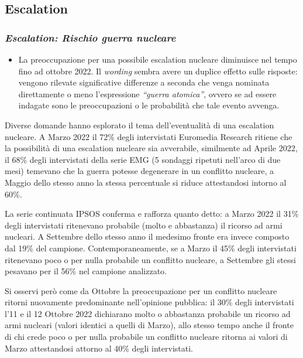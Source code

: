 \documentclass[
]{book}
\providecommand{\tightlist}{%
  \setlength{\itemsep}{0pt}\setlength{\parskip}{0pt}}
\begin{document}
\hypertarget{escalation}{%
\subsection{Escalation}\label{escalation}}

\hypertarget{escalation-rischio-guerra-nucleare}{%
\subsubsection{\texorpdfstring{\emph{Escalation: Rischio guerra nucleare}}{Escalation: Rischio guerra nucleare}}\label{escalation-rischio-guerra-nucleare}}

\begin{itemize}
\tightlist
\item
  La preoccupazione per una possibile escalation nucleare diminuisce nel tempo fino ad ottobre 2022. Il \emph{wording} sembra avere un duplice effetto sulle risposte: vengono rilevate significative differenze a seconda che venga nominata direttamente o meno l'espressione \emph{``guerra atomica''}, ovvero se ad essere indagate sono le preoccupazioni o le probabilità che tale evento avvenga.
\end{itemize}

Diverse domande hanno esplorato il tema dell'eventualità di una escalation nucleare. A Marzo 2022 il 72\% degli intervistati Euromedia Research ritiene che la possibilità di una escalation nucleare sia avverabile, similmente ad Aprile 2022, il 68\% degli intervistati della serie EMG (5 sondaggi ripetuti nell'arco di due mesi) temevano che la guerra potesse degenerare in un conflitto nucleare, a Maggio dello stesso anno la stessa percentuale si riduce attestandosi intorno al 60\%.

La serie continuata IPSOS conferma e rafforza quanto detto: a Marzo 2022 il 31\% degli intervistati ritenevano probabile (molto e abbastanza) il ricorso ad armi nucleari. A Settembre dello stesso anno il medesimo fronte era invece composto dal 19\% del campione. Contemporaneamente, se a Marzo il 45\% degli intervistati ritenevano poco o per nulla probabile un conflitto nucleare, a Settembre gli stessi pesavano per il 56\% nel campione analizzato.

Si osservi però come da Ottobre la preoccupazione per un conflitto nucleare ritorni nuovamente predominante nell'opinione pubblica: il 30\% degli intervistati l'11 e il 12 Ottobre 2022 dichiarano molto o abbastanza probabile un ricorso ad armi nucleari (valori identici a quelli di Marzo), allo stesso tempo anche il fronte di chi crede poco o per nulla probabile un conflitto nucleare ritorna ai valori di Marzo attestandosi attorno al 40\% degli intervistati.
\end{document}
